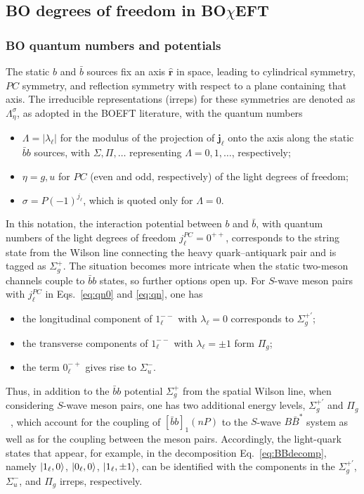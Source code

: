 \documentclass[aps,prd,showpacs,amsmath,twocolumn,superscriptaddress,floatfix,nofootinbib,notitlepage]{revtex4-2}
\newcommand{\bbnP}{[\bar{b}b]_1(nP)}
\newcommand{\ver}{{\bm r}}
\newcommand{\BOchiEFT}{BO$\chi$EFT\xspace}
\begin{document}
\subsection{BO degrees of freedom in \BOchiEFT}
\label{sec:BO}

\subsubsection{BO quantum numbers and potentials}
\label{sec:relBOEFT}

The static $b$ and $\bar{b}$ sources fix an axis $\hat{\ver}$ in space, leading to cylindrical symmetry, $PC$ symmetry, and reflection symmetry with respect to a plane containing that axis. The irreducible representations (irreps) for these symmetries are denoted as $\Lambda_\eta^\sigma$, as adopted in the BOEFT literature, with the quantum numbers
\begin{itemize}
\item $\Lambda=|\lambda_\ell|$ for the modulus of the projection of $\bm{j}_\ell$ onto the axis along the static $\bar{b}b$ sources, with $\Sigma,\Pi,\dots$ representing $\Lambda=0,1,\dots$, respectively;
\item $\eta=g,u$ for $PC$ (even and odd, respectively) of the light degrees of freedom;
\item $\sigma=P(-1)^{j_\ell}$, which is quoted only for $\Lambda=0$.
\end{itemize}

In this notation, the interaction potential between $b$ and $\bar{b}$, with quantum numbers of the light degrees of freedom $j_{\ell}^{PC}=0^{++}$, corresponds to the string state from the Wilson line connecting the heavy quark--antiquark pair and is tagged as $\Sigma_g^+$. The situation becomes more intricate when the static two-meson channels couple to $\bar{b}b$ states, so further options open up. For $S$-wave meson pairs with $j_\ell^{PC}$ in Eqs.~\eqref{eq:qn0} and \eqref{eq:qn}, one has
\begin{itemize}
\item the longitudinal component of $1_\ell^{--}$ with $\lambda_\ell=0$ corresponds to $\Sigma_g^{+\prime}$;
\item the transverse components of $1_\ell^{--}$ with $\lambda_\ell=\pm1$ form $\Pi_g$;
\item the term $0_\ell^{-+}$ gives rise to $\Sigma_u^-$.
\end{itemize}
Thus, in addition to the $\bar{b}b$ potential $\Sigma_g^+$ from the spatial Wilson line, when considering $S$-wave meson pairs, one has two additional energy levels, $\Sigma_g^{+\prime}$ and $\Pi_g$~\cite{Berwein:2024ztx,Brambilla:2026jqz}, which account for the coupling of $\bbnP$ to the $S$-wave $B\bar{B}^*$ system as well as for the coupling between the meson pairs. Accordingly, the
light-quark states
that appear, for example,
in the decomposition Eq.~\eqref{eq:BBdecomp}, namely
$\ket{1_\ell,0}$, $\ket{0_\ell,0}$, $\ket{1_\ell,\pm 1}$, can be identified with the components in the $\Sigma_g^{+\prime}$, $\Sigma_u^{-}$, and $\Pi_g$ irreps, respectively.
\end{document}
